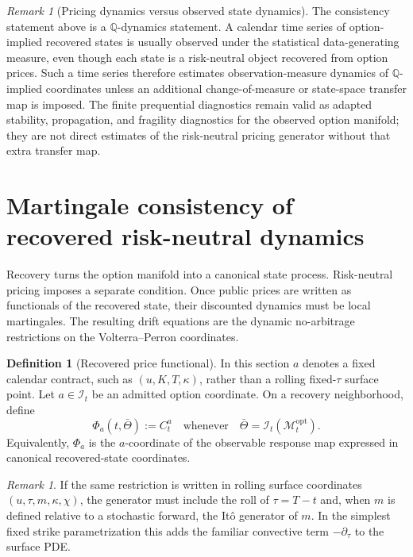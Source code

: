 \documentclass[11pt,a4paper]{amsart}
\theoremstyle{plain}
\theoremstyle{definition}
\newtheorem{definition}[theorem]{Definition}
\theoremstyle{remark}
\newtheorem{remark}[theorem]{Remark}
\newcommand{\QQ}{\mathbb{Q}}
\newcommand{\cI}{\mathcal{I}}
\newcommand{\cM}{\mathcal{M}}
\begin{document}
\begin{remark}[Pricing dynamics versus observed state dynamics]\label{rem:q-state-observation-measure}
The consistency statement above is a \(\QQ\)-dynamics statement.  A calendar time series of
option-implied recovered states is usually observed under the statistical data-generating measure,
even though each state is a risk-neutral object recovered from option prices.  Such a time series
therefore estimates observation-measure dynamics of \(\QQ\)-implied coordinates unless an
additional change-of-measure or state-space transfer map is imposed.  The finite prequential
diagnostics remain valid as adapted stability, propagation, and fragility diagnostics for the
observed option manifold; they are not direct estimates of the risk-neutral pricing generator
without that extra transfer map.
\end{remark}

\section{Martingale consistency of recovered risk-neutral dynamics}\label{sec:martingale}

Recovery turns the option manifold into a canonical state process.  Risk-neutral pricing imposes a
separate condition.  Once public prices are written as functionals of the recovered state, their
discounted dynamics must be local martingales.  The resulting drift equations are the dynamic
no-arbitrage restrictions on the Volterra--Perron coordinates.

\begin{definition}[Recovered price functional]\label{def:recovered-price-functional}
In this section \(a\) denotes a fixed calendar contract, such as
\((u,K,T,\kappa)\), rather than a rolling fixed-\(\tau\) surface point.  Let \(a\in\cI_t\) be an
admitted option coordinate.  On a recovery neighborhood, define
\[
        \Phi_a(t,\bar\Theta)
        :=
        C_t^a
        \quad\text{whenever}\quad
        \bar\Theta=\mathcal I_t(\cM_t^{\mathrm{opt}}).
\]
Equivalently, \(\Phi_a\) is the \(a\)-coordinate of the observable response map expressed in
canonical recovered-state coordinates.
\end{definition}

\begin{remark}
If the same restriction is written in rolling surface coordinates
\((u,\tau,m,\kappa,\chi)\), the generator must include the roll of \(\tau=T-t\) and, when \(m\) is
defined relative to a stochastic forward, the It\^o generator of \(m\).  In the simplest fixed
strike parametrization this adds the familiar convective term \(-\partial_\tau\) to the surface
PDE.
\end{remark}
\end{document}
